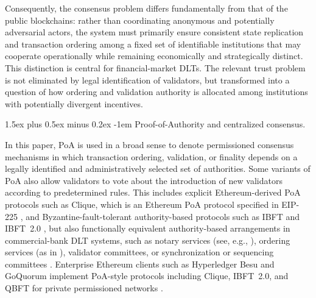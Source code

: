 \documentclass[
reprint,
showkeys,
superscriptaddress,
aps,
pra,
longbibliography,
nofootinbib,
]{revtex4-2}
\makeatletter
\theoremstyle{definition}\newtheorem{definition}{Definition}
\renewcommand\paragraph{%
	\@startsection{paragraph}{4}{\z@}%
	{1.5ex plus 0.5ex minus 0.2ex}%
	{-1em}%
	{\normalfont\normalsize\bfseries}%
}
\makeatother
\begin{document}
Consequently, the consensus problem differs fundamentally from that of the public blockchains: rather than coordinating anonymous and potentially adversarial actors, the system must primarily ensure consistent state replication and transaction ordering among a fixed set of identifiable institutions that may cooperate operationally while remaining economically and strategically distinct.
This distinction is central for financial-market DLTs.
The relevant trust problem is not eliminated by legal identification of validators, but transformed into a question of how ordering and validation authority is allocated among institutions with potentially divergent incentives.




\paragraph{Proof-of-Authority and centralized consensus.}

In this paper, PoA is used in a broad sense to denote permissioned consensus mechanisms in which transaction ordering, validation, or finality depends on a legally identified and administratively selected set of authorities.
Some variants of PoA also allow validators to vote about the introduction of new validators according to predetermined rules.
This includes explicit Ethereum-derived PoA protocols such as Clique, which is an Ethereum PoA protocol specified in EIP-225 \cite{szilagyi2017clique}, and Byzantine-fault-tolerant authority-based protocols such as IBFT and IBFT~2.0 \cite{moniz2020ibft,saltini2019ibft2}, but also functionally equivalent authority-based arrangements in commercial-bank DLT systems, such as notary services (see, e.g., \cite{cordaNotary}), ordering services (as in \cite{fabricOrdering}), validator committees, or synchronization or sequencing committees \cite{canton_network_whitepaper_2024}.
Enterprise Ethereum clients such as Hyperledger Besu and GoQuorum implement PoA-style protocols including Clique, IBFT~2.0, and QBFT for private permissioned networks \cite{besuPoa,goquorumConsensus}.
\end{document}
